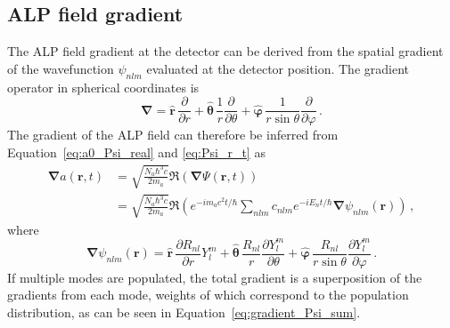 
\subsection{ALP field gradient}\label{sec:theory:earthALP:gradient}

The ALP field gradient at the detector can be derived from the spatial gradient of the wavefunction $\psi_{nlm}$ evaluated at the detector position. 
The gradient operator in spherical coordinates is
\begin{equation}
    \boldsymbol{\nabla} = \hat{\mathbf{r}}\,\frac{\partial}{\partial r} + \hat{\boldsymbol{\theta}}\,\frac{1}{r}\frac{\partial}{\partial \theta} + \hat{\boldsymbol{\varphi}}\,\frac{1}{r\sin\theta}\frac{\partial}{\partial \varphi}
    \,.\label{eq:gradient_spherical}
\end{equation}
The gradient of the ALP field can therefore be inferred from Equation~\eqref{eq:a0_Psi_real} and \eqref{eq:Psi_r_t} as
\begin{align}
    \boldsymbol{\nabla}a(\mathbf{r}, t)
    &= \sqrt{\frac{N_a \hbar^3 c}{2 m_a}} \Re\left( \boldsymbol{\nabla} \Psi(\mathbf{r}, t) \right) \\
    &= \sqrt{\frac{N_a \hbar^3 c}{2 m_a}} \Re\left( e^{-i m_a c^2 t / \hbar}\sum_{nlm}^{} c_{nlm} e^{-i E_n t / \hbar} \boldsymbol{\nabla}\psi_{nlm}(\mathbf{r}) \right)
    \,,\label{eq:gradient_Psi_sum}
\end{align}
where
\begin{equation}
    \boldsymbol{\nabla}\psi_{nlm}(\mathbf{r})       
    = \hat{\mathbf{r}}\,\frac{\partial R_{nl}}{\partial r}Y_l^m + \hat{\boldsymbol{\theta}}\,\frac{R_{nl}}{r}\frac{\partial Y_l^m}{\partial \theta} + \hat{\boldsymbol{\varphi}}\,\frac{R_{nl}}{r\sin\theta}\frac{\partial Y_l^m}{\partial \varphi}
    \,.\label{eq:gradient_psi_nlm}
\end{equation}
If multiple modes are populated, the total gradient is a superposition of the gradients from each mode, weights of which correspond to the population distribution, as can be seen in Equation~\eqref{eq:gradient_Psi_sum}.

